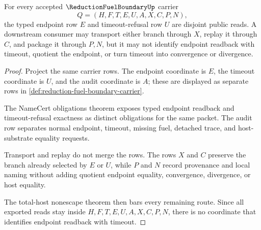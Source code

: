 \begin{theorem}
\label{thm:reduction-fuel-boundary-endpoint-timeout-disjointness}
For every accepted $\ReductionFuelBoundaryUp$ carrier
$$
Q=(H,F,T,E,U,A,X,C,P,N),
$$
the typed endpoint row $E$ and timeout-refusal row $U$ are disjoint public reads. A downstream consumer may transport either branch through $X$, replay it through $C$, and package it through $P,N$, but it may not identify endpoint readback with timeout, quotient the endpoint, or turn timeout into convergence or divergence.
\end{theorem}
\begin{proof}
Project the same carrier rows. The endpoint coordinate is $E$, the timeout coordinate is $U$, and the audit coordinate is $A$; these are displayed as separate rows in \autoref{def:reduction-fuel-boundary-carrier}.

The NameCert obligations theorem exposes typed endpoint readback and timeout-refusal exactness as distinct obligations for the same packet. The audit row separates normal endpoint, timeout, missing fuel, detached trace, and host-substrate equality requests.

Transport and replay do not merge the rows. The rows $X$ and $C$ preserve the branch already selected by $E$ or $U$, while $P$ and $N$ record provenance and local naming without adding quotient endpoint equality, convergence, divergence, or host equality.

The total-host nonescape theorem then bars every remaining route. Since all exported reads stay inside $H,F,T,E,U,A,X,C,P,N$, there is no coordinate that identifies endpoint readback with timeout.
\end{proof}

